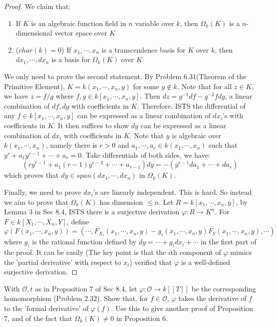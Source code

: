\documentclass{solution}
\begin{document}
\begin{proof}
    We claim that: 
    \begin{enumerate}
        \item If $K$ is an algebraic function field in $n$ variable over $k$, then $\Omega_k(K)$ is a $n$-dimensional vector space over $K$
        \item ($char(k) = 0$) If $x_1, \cdots, x_n$ is a transcendence basis for $K$ over $k$, then $dx_1, \cdots, dx_n$ is a basis for $\Omega_k(K)$ over $K$
    \end{enumerate}

    We only need to prove the second statement. By Problem 6.31(Theorem of the Primitive Element), $K = k(x_1, \cdots, x_n, y)$ for some $y \notin k$. Note that for all $z \in K$, we have $z = f / g$ where $f, g \in k[x_1, \cdots, x_n, y]$. Then $dz = g ^{-1} df - g ^{-2} f dg$, a linear combination of $df, dg$ with coefficients in $K$. Therefore, ISTS the differential of any $f \in k[x_1, \cdots, x_n, y]$ can be expressed as a linear combination of $dx_i$'s with coefficients in $K$. It then suffices to show $dy$ can be expressed as a linear combination of $dx_i$ with coefficients in $K$. Note that $y$ is algebraic over $k(x_1, \cdots, x_n)$, namely there is $r \gt 0$ and $a_1, \cdots, a_r \in k(x_1, \cdots, x_n)$ such that $y^r + a_1y^{r - 1} + \cdots + a_r = 0$. Take differentials of both sides, we have:
    $$(ry^{r - 1} + a_1(r - 1)y^{r - 2} + \cdots + a_{r - 1}) dy = -(y^{r - 1} da_1 + \cdots + da_r)$$
    which proves that $dy \in span(dx_1, \cdots, dx_n)$ in $\Omega_k(K)$.

    Finally, we need to prove $dx_i$'s are linearly independent. This is hard. So instead we aim to prove that $\Omega_k(K)$ has dimension $\le n$. Let $R = k[x_1, \cdots, x_n, y]$, by Lemma 3 in Sec 8.4, ISTS there is a surjective derivation $\varphi: R \rightarrow K^n$. For $F \in k[X_1, \cdots, X_n, Y]$, define
    $$\varphi(F(x_1, \cdots, x_n, y)) = (\cdots, F_{X_i}(x_1, \cdots, x_n, y) - g_i(x_1, \cdots, x_n, y) F_{Y}(x_1, \cdots, x_n, y), \cdots)$$
    where $g_i$ is the rational function defined by $dy = \cdots + g_i dx_i + \cdots$ in the first part of the proof. It can be easily (The key point is that the $i$th component of $\varphi$ mimics the 'partial derivative' with respect to $x_i$) verified that $\varphi$ is a well-defined surjective derivation. 
\end{proof}

\begin{problem}{8.23}
    With $\mathcal{O}, t$ as in Proposition 7 of Sec 8.4, let $\varphi: \mathcal{O} \rightarrow k[[T]]$ be the corresponding homomorphism (Problem 2.32). Show that, for $f \in \mathcal{O}$, $\varphi$ takes the derivative of $f$ to the 'formal derivative' of $\varphi(f)$. Use this to give another proof of Proposition 7, and of the fact that $\Omega_k(K) \ne 0$ in Proposition 6.
\end{problem}
\end{document}
